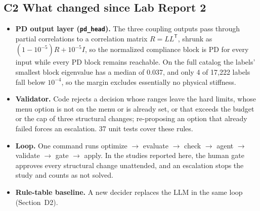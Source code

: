 \documentclass[11pt]{article}
\begin{document}
\subsection*{C2 \quad What changed since Lab Report 2}
\begin{itemize}
\item \textbf{PD output layer (\texttt{pd\_head}).} The three coupling outputs pass through
  partial correlations to a correlation matrix $R = LL^{\mathsf T}$, shrunk as
  $(1-10^{-5})R + 10^{-5}I$, so the normalized compliance block is PD for every input while every
  PD block remains reachable. On the full catalog the labels' smallest block eigenvalue has a
  median of 0.037, and only 4 of 17,222 labels fall below $10^{-4}$, so the margin excludes
  essentially no physical stiffness.
\item \textbf{Validator.} Code rejects a decision whose ranges leave the hard limits, whose menu
  option is not on the menu or is already set, or that exceeds the budget or the cap of three
  structural changes; re-proposing an option that already failed forces an escalation. 37 unit
  tests cover these rules.
\item \textbf{Loop.} One command runs optimize $\to$ evaluate $\to$ check $\to$ agent $\to$
  validate $\to$ gate $\to$ apply. In the studies reported here, the human gate approves every
  structural change unattended, and an escalation stops the study and counts as not solved.
\item \textbf{Rule-table baseline.} A new decider replaces the LLM in the same loop
  (Section~D2).
\end{itemize}
\end{document}

